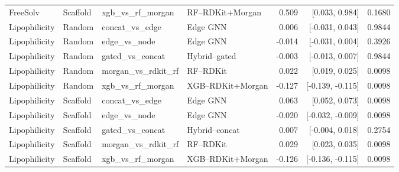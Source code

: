 \begin{tabular}{llllrrr}
FreeSolv & Scaffold & xgb\_vs\_rf\_morgan & RF--RDKit+Morgan & 0.509 & [0.033, 0.984] & 0.1680 \\
Lipophilicity & Random & concat\_vs\_edge & Edge GNN & 0.006 & [-0.031, 0.043] & 0.9844 \\
Lipophilicity & Random & edge\_vs\_node & Edge GNN & -0.014 & [-0.031, 0.004] & 0.3926 \\
Lipophilicity & Random & gated\_vs\_concat & Hybrid--gated & -0.003 & [-0.013, 0.007] & 0.9844 \\
Lipophilicity & Random & morgan\_vs\_rdkit\_rf & RF--RDKit & 0.022 & [0.019, 0.025] & 0.0098 \\
Lipophilicity & Random & xgb\_vs\_rf\_morgan & XGB--RDKit+Morgan & -0.127 & [-0.139, -0.115] & 0.0098 \\
Lipophilicity & Scaffold & concat\_vs\_edge & Edge GNN & 0.063 & [0.052, 0.073] & 0.0098 \\
Lipophilicity & Scaffold & edge\_vs\_node & Edge GNN & -0.020 & [-0.032, -0.009] & 0.0098 \\
Lipophilicity & Scaffold & gated\_vs\_concat & Hybrid--concat & 0.007 & [-0.004, 0.018] & 0.2754 \\
Lipophilicity & Scaffold & morgan\_vs\_rdkit\_rf & RF--RDKit & 0.029 & [0.023, 0.035] & 0.0098 \\
Lipophilicity & Scaffold & xgb\_vs\_rf\_morgan & XGB--RDKit+Morgan & -0.126 & [-0.136, -0.115] & 0.0098 \\
\bottomrule
\end{tabular}
